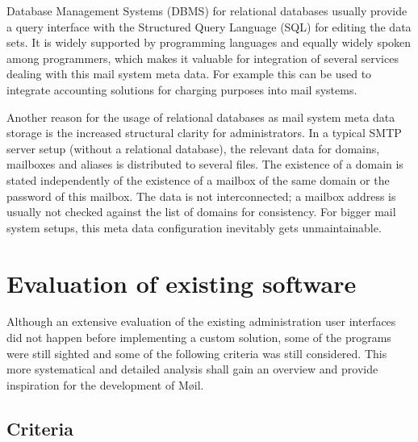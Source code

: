 \documentclass[12pt,a4paper]{scrartcl}
\begin{document}
		Database Management Systems (DBMS) for relational databases usually
		provide a query interface with the Structured Query Language (SQL)
		\cite{sql} for editing the data sets. It is widely supported by
		programming languages and equally widely spoken among programmers, which
		makes it valuable for integration of several services dealing with this
		mail system meta data. For example this can be used to integrate
		accounting solutions for charging purposes into mail systems.


		Another reason for the usage of relational databases as mail system
		meta data storage is the increased structural clarity for
		administrators. In a typical SMTP server setup (without a relational
		database), the relevant data for domains, mailboxes and aliases is
		distributed to several files. The existence of a domain is stated
		independently of the existence of a mailbox of the same domain or the
		password of this mailbox. The data is not interconnected; a mailbox
		address is usually not checked against the list of domains for
		consistency. For bigger mail system setups, this meta data
		configuration inevitably gets unmaintainable.

	\section*{Evaluation of existing software}

		Although an extensive evaluation of the existing administration user
		interfaces did not happen before implementing a custom solution, some
		of the programs were still sighted and some of the following criteria
		was still considered. This more systematical and detailed analysis
		shall gain an overview and provide inspiration for the development of
		Møil.

		\subsection*{Criteria}
\end{document}

